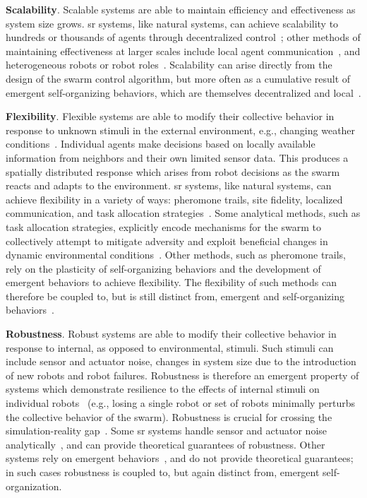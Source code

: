 \textbf{Scalability}. Scalable systems are able to maintain efficiency and
effectiveness as system size grows. \gls{sr} systems, like natural systems, can
achieve scalability to hundreds or thousands of agents through decentralized
control~\cite{Matthey2009}; other methods of maintaining effectiveness at larger
scales include local agent communication~\cite{Agassounon2001,Lerman2006}, and
heterogeneous robots or robot roles~\cite{Lu2020,Harwell2019a}.  Scalability
can arise directly from the design of the swarm control algorithm, but more
often as a cumulative result of emergent self-organizing behaviors, which
are themselves decentralized and local~\cite{DeWolf2005}.

\textbf{Flexibility}. Flexible systems are able to modify their collective
behavior in response to unknown stimuli in the external environment, e.g.,
changing weather conditions~\cite{Harwell2019a,Just2017,Hunt2020}. Individual
agents make decisions based on locally available information from neighbors and
their own limited sensor data. This produces a spatially distributed response
which arises from robot decisions as the swarm reacts and adapts to the
environment. \gls{sr} systems, like natural systems, can achieve flexibility in a
variety of ways: pheromone trails, site fidelity, localized communication, and
task allocation strategies~\cite{Just2017,Harwell2019a}. Some analytical methods,
such as task allocation strategies, explicitly encode mechanisms for the swarm
to collectively attempt to mitigate adversity and exploit beneficial changes in
dynamic environmental conditions~\cite{Just2017,Winfield2008}. Other methods,
such as pheromone trails, rely on the plasticity of self-organizing behaviors
and the development of emergent behaviors to achieve flexibility. The
flexibility of such methods can therefore be coupled to, but is still distinct
from, emergent and self-organizing behaviors~\cite{DeWolf2005}.

\textbf{Robustness}. Robust systems are able to modify their collective behavior
in response to internal, as opposed to environmental, stimuli.  Such
stimuli can include sensor and actuator noise, changes in system size due to the
introduction of new robots and robot failures.
Robustness is therefore an emergent property of systems which demonstrate
resilience to the effects of internal stimuli on individual
robots~\cite{DeWolf2005} (e.g., losing a single robot or set of robots minimally
perturbs the collective behavior of the swarm).  Robustness is crucial for
crossing the simulation-reality gap~\cite{Hecker2015,Francesca2014}.  Some \gls{sr}
systems handle sensor and actuator noise
analytically~\cite{Dallalibera2011,Claudi2014,Turgut2008}, and can provide
theoretical guarantees of robustness.  Other systems rely on emergent
behaviors~\cite{Harwell2020a}, and do not provide theoretical guarantees; in
such cases robustness is coupled to, but again distinct from, emergent
self-organization. %

